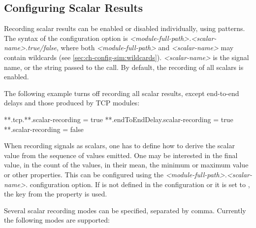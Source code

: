\subsection{Configuring Scalar Results}
\label{sec:ana-sim:scalar-results}

Recording scalar results can be enabled or disabled individually, using
patterns. The syntax of the configuration option is
\textit{<module-full-path>.<scalar-name>.}\textit{true/false},
where both \textit{<module-full-path>} and \textit{<scalar-name>}
may contain wildcards (see \ref{sec:ch-config-sim:wildcards}).
\textit{<scalar-name>} is the signal name, or the string passed to the
 call. By default, the recording of all scalars is
enabled.

The following example turns off recording all scalar results, except
end-to-end delays and those produced by TCP modules:

\begin{inifile}
**.tcp.**.scalar-recording = true
**.endToEndDelay.scalar-recording = true
**.scalar-recording = false
\end{inifile}


When recording signals as scalars, one has to define how to derive the
scalar value from the sequence of values emitted. One may be interested
in the final value, in the count of the values, in their mean, the minimum
or maximum value or other properties. This can be configured using the
\textit{<module-full-path>.<scalar-name>.}
configuration option. If  is not defined
in the configuration or it is set to , the  key
from the  property is used.

Several scalar recording modes can be specified, separated by comma.
Currently the following modes are supported:

